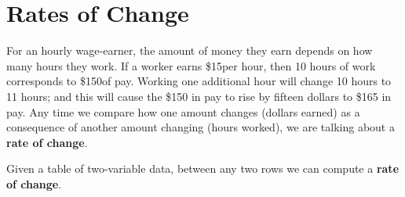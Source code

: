 \documentclass{ximera}
\begin{document}

\section{Rates of Change}

For an hourly wage-earner, the amount of money they earn depends on how many hours they work. If a worker earns \$15per hour, then 10
hours of work corresponds to \$150of pay. Working one additional hour will change 10 hours to 11 hours; and this will cause the \$150 in pay to rise by fifteen dollars to \$165 in pay. Any time we compare how one amount changes (dollars earned) as a consequence of another amount changing (hours worked), we are talking about a \textbf{rate of change}.

Given a table of two-variable data, between any two rows we can compute a \textbf{rate of change}.
\end{document}
